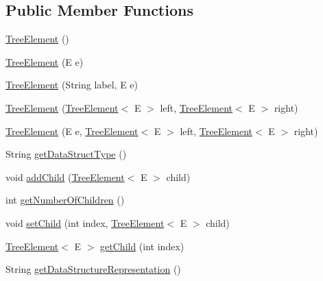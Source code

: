 \subsection*{Public Member Functions}
\begin{DoxyCompactItemize}
\item 
\mbox{\hyperlink{classbridges_1_1base_1_1_tree_element_ab1af682e9304f5427e308ba5f43d7a9a}{Tree\+Element}} ()
\item 
\mbox{\hyperlink{classbridges_1_1base_1_1_tree_element_a0f17c278536239fb6cba051246ef67a8}{Tree\+Element}} (E e)
\item 
\mbox{\hyperlink{classbridges_1_1base_1_1_tree_element_a476cbeedf2c56f6a40a632035b7d740e}{Tree\+Element}} (String label, E e)
\item 
\mbox{\hyperlink{classbridges_1_1base_1_1_tree_element_aae24dfde287dc0596c69ad853f12f72e}{Tree\+Element}} (\mbox{\hyperlink{classbridges_1_1base_1_1_tree_element}{Tree\+Element}}$<$ E $>$ left, \mbox{\hyperlink{classbridges_1_1base_1_1_tree_element}{Tree\+Element}}$<$ E $>$ right)
\item 
\mbox{\hyperlink{classbridges_1_1base_1_1_tree_element_ace86faa0e65626833c61cc8418cfb1ed}{Tree\+Element}} (E e, \mbox{\hyperlink{classbridges_1_1base_1_1_tree_element}{Tree\+Element}}$<$ E $>$ left, \mbox{\hyperlink{classbridges_1_1base_1_1_tree_element}{Tree\+Element}}$<$ E $>$ right)
\item 
String \mbox{\hyperlink{classbridges_1_1base_1_1_tree_element_a5e0d5f8991d72bd7b0e76d6b0b8662a7}{get\+Data\+Struct\+Type}} ()
\item 
void \mbox{\hyperlink{classbridges_1_1base_1_1_tree_element_a473c29486e99edc725423941b203e939}{add\+Child}} (\mbox{\hyperlink{classbridges_1_1base_1_1_tree_element}{Tree\+Element}}$<$ E $>$ child)
\item 
int \mbox{\hyperlink{classbridges_1_1base_1_1_tree_element_a3722c7cec66ff297f999870df0da3cff}{get\+Number\+Of\+Children}} ()
\item 
void \mbox{\hyperlink{classbridges_1_1base_1_1_tree_element_aefafebb19d64398d150e464e4361ddf0}{set\+Child}} (int index, \mbox{\hyperlink{classbridges_1_1base_1_1_tree_element}{Tree\+Element}}$<$ E $>$ child)
\item 
\mbox{\hyperlink{classbridges_1_1base_1_1_tree_element}{Tree\+Element}}$<$ E $>$ \mbox{\hyperlink{classbridges_1_1base_1_1_tree_element_a4ee40d69ce52fdcac321554564d10aa3}{get\+Child}} (int index)
\item 
String \mbox{\hyperlink{classbridges_1_1base_1_1_tree_element_a674870c91b39fac88d35a569fd505e9b}{get\+Data\+Structure\+Representation}} ()
\end{DoxyCompactItemize}
